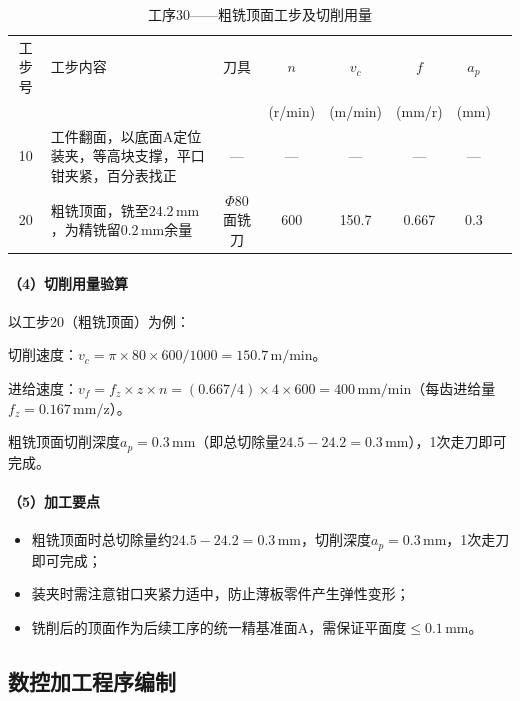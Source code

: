 \documentclass{xautCADreport}
\begin{document}
\begin{table}[H]
  \centering
  \caption{工序30——粗铣顶面工步及切削用量}
  \label{tab:op30_die}
  \small
  \setlength{\tabcolsep}{5pt}
  \begin{tabular}{cp{5cm}cccccc}
    \toprule
    工步号 & 工步内容 & 刀具 & \multicolumn{1}{c}{$n$} & \multicolumn{1}{c}{$v_c$} & \multicolumn{1}{c}{$f$} & \multicolumn{1}{c}{$a_p$} \\
    & & & (r/min) & (m/min) & (mm/r) & (mm) \\
    \midrule
    10 & 工件翻面，以底面A定位装夹，等高块支撑，平口钳夹紧，百分表找正 & — & — & — & — & — \\
    20 & 粗铣顶面，铣至$24.2\,\mathrm{mm}$，为精铣留$0.2\,\mathrm{mm}$余量 & $\Phi80$面铣刀 & 600 & 150.7 & 0.667 & 0.3 \\
    \bottomrule
  \end{tabular}
\end{table}

\paragraph{（4）切削用量验算}

以工步20（粗铣顶面）为例：

切削速度：$v_c = \pi \times 80 \times 600 / 1000 = 150.7\,\mathrm{m/min}$。

进给速度：$v_f = f_z \times z \times n = (0.667/4) \times 4 \times 600 = 400\,\mathrm{mm/min}$（每齿进给量$f_z = 0.167\,\mathrm{mm/z}$）。

粗铣顶面切削深度$a_p=0.3\,\mathrm{mm}$（即总切除量$24.5-24.2=0.3\,\mathrm{mm}$），1次走刀即可完成。

\paragraph{（5）加工要点}

\begin{itemize}
  \item 粗铣顶面时总切除量约$24.5-24.2=0.3\,\mathrm{mm}$，切削深度$a_p=0.3\,\mathrm{mm}$，1次走刀即可完成；
  \item 装夹时需注意钳口夹紧力适中，防止薄板零件产生弹性变形；
  \item 铣削后的顶面作为后续工序的统一精基准面A，需保证平面度$\leq0.1\,\mathrm{mm}$。
\end{itemize}

\subsection{数控加工程序编制}
\end{document}
